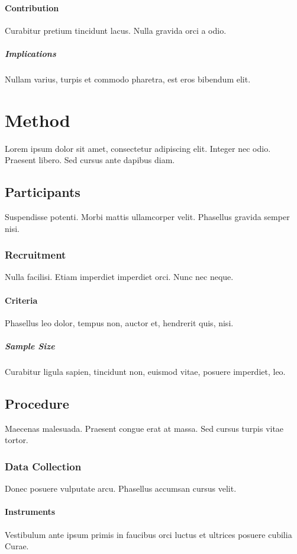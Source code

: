 \documentclass{article}
\begin{document}
\paragraph{Contribution}
Curabitur pretium tincidunt lacus. Nulla gravida orci a odio.

\subparagraph{Implications}
Nullam varius, turpis et commodo pharetra, est eros bibendum elit.

\section{Method}
Lorem ipsum dolor sit amet, consectetur adipiscing elit. Integer nec odio. Praesent libero. Sed cursus ante dapibus diam.

\subsection{Participants}
Suspendisse potenti. Morbi mattis ullamcorper velit. Phasellus gravida semper nisi.

\subsubsection{Recruitment}
Nulla facilisi. Etiam imperdiet imperdiet orci. Nunc nec neque.

\paragraph{Criteria}
Phasellus leo dolor, tempus non, auctor et, hendrerit quis, nisi.

\subparagraph{Sample Size}
Curabitur ligula sapien, tincidunt non, euismod vitae, posuere imperdiet, leo.

\subsection{Procedure}
Maecenas malesuada. Praesent congue erat at massa. Sed cursus turpis vitae tortor.

\subsubsection{Data Collection}
Donec posuere vulputate arcu. Phasellus accumsan cursus velit.

\paragraph{Instruments}
Vestibulum ante ipsum primis in faucibus orci luctus et ultrices posuere cubilia Curae.
\end{document}
